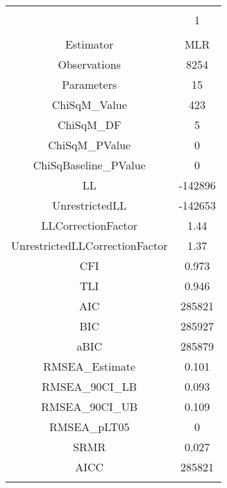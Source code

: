 
\begin{table}[!htbp] \centering 
  \caption{} 
  \label{} 
\begin{tabular}{@{\extracolsep{5pt}} cc} 
\\[-1.8ex]\hline 
\hline \\[-1.8ex] 
 & 1 \\ 
\hline \\[-1.8ex] 
Estimator & MLR \\ 
Observations & 8254 \\ 
Parameters & 15 \\ 
ChiSqM\_Value & 423 \\ 
ChiSqM\_DF & 5 \\ 
ChiSqM\_PValue & 0 \\ 
ChiSqBaseline\_PValue & 0 \\ 
LL & -142896 \\ 
UnrestrictedLL & -142653 \\ 
LLCorrectionFactor & 1.44 \\ 
UnrestrictedLLCorrectionFactor & 1.37 \\ 
CFI & 0.973 \\ 
TLI & 0.946 \\ 
AIC & 285821 \\ 
BIC & 285927 \\ 
aBIC & 285879 \\ 
RMSEA\_Estimate & 0.101 \\ 
RMSEA\_90CI\_LB & 0.093 \\ 
RMSEA\_90CI\_UB & 0.109 \\ 
RMSEA\_pLT05 & 0 \\ 
SRMR & 0.027 \\ 
AICC & 285821 \\ 
\hline \\[-1.8ex] 
\end{tabular} 
\end{table} 

